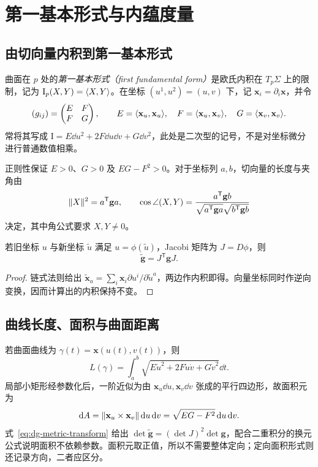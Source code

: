 \setcounter{chapter}{4} %
\chapter{第一基本形式与内蕴度量}
\label{chap:dg-metric}

\section{由切向量内积到第一基本形式}
\begin{definition}[第一基本形式]
曲面在 $p$ 处的\emph{第一基本形式（first fundamental form）}是欧氏内积在 $T_p\Sigma$ 上的限制，记为 $\mathrm I_p(X,Y)=\langle X,Y\rangle$。在坐标 $(u^1,u^2)=(u,v)$ 下，记 $\mathbf x_i=\partial_i\mathbf x$，并令
\[
 (g_{ij})=\begin{pmatrix}E&F\\F&G\end{pmatrix},\qquad
 E=\langle \mathbf x_u,\mathbf x_u\rangle,\quad
 F=\langle \mathbf x_u,\mathbf x_v\rangle,\quad
 G=\langle \mathbf x_v,\mathbf x_v\rangle.
\]
常将其写成 $\mathrm I=E\dd u^2+2F\dd u\dd v+G\dd v^2$，此处是二次型的记号，不是对坐标微分进行普通数值相乘。
\end{definition}
正则性保证 $E>0$、$G>0$ 及 $EG-F^2>0$。对于坐标列 $a,b$，切向量的长度与夹角由
\[
 \lVert X\rVert^2=a^{\mathsf T}\mathbf g a,\qquad
 \cos\angle(X,Y)=\frac{a^{\mathsf T}\mathbf g b}
 {\sqrt{a^{\mathsf T}\mathbf g a}\sqrt{b^{\mathsf T}\mathbf g b}}
\]
决定，其中角公式要求 $X,Y\ne0$。

\begin{proposition}[度量变换律]
若旧坐标 $u$ 与新坐标 $\widetilde u$ 满足 $u=\phi(\widetilde u)$，Jacobi 矩阵为 $J=D\phi$，则
\begin{equation}
 \widetilde{\mathbf g}=J^{\mathsf T}\mathbf gJ.
 \label{eq:dg-metric-transform}
\end{equation}
\end{proposition}
\begin{proof}
链式法则给出 $\widetilde{\mathbf x}_a=\sum_i\mathbf x_i\partial u^i/\partial\widetilde u^a$，两边作内积即得。向量坐标同时作逆向变换，因而计算出的内积保持不变。
\end{proof}

\section{曲线长度、面积与曲面距离}
若曲面曲线为 $\gamma(t)=\mathbf x(u(t),v(t))$，则
\begin{equation}
 L(\gamma)=\int_a^b\sqrt{E\dot u^2+2F\dot u\dot v+G\dot v^2}\dd t.
 \label{eq:dg-surface-length}
\end{equation}
局部小矩形经参数化后，一阶近似为由 $\mathbf x_u\dd u,\mathbf x_v\dd v$ 张成的平行四边形，故面积元为
\begin{equation}
 \mathop{}\!\mathrm d A=\lVert \mathbf x_u\times\mathbf x_v\rVert\mathop{}\!\mathrm d u\mathop{}\!\mathrm d v
       =\sqrt{EG-F^2}\mathop{}\!\mathrm d u\mathop{}\!\mathrm d v.
 \label{eq:dg-area}
\end{equation}
式~\eqref{eq:dg-metric-transform} 给出 $\det\widetilde{\mathbf g}=(\det J)^2\det\mathbf g$，配合二重积分的换元公式说明面积不依赖参数。面积元取正值，所以不需要整体定向；定向面积形式则还记录方向，二者应区分。

